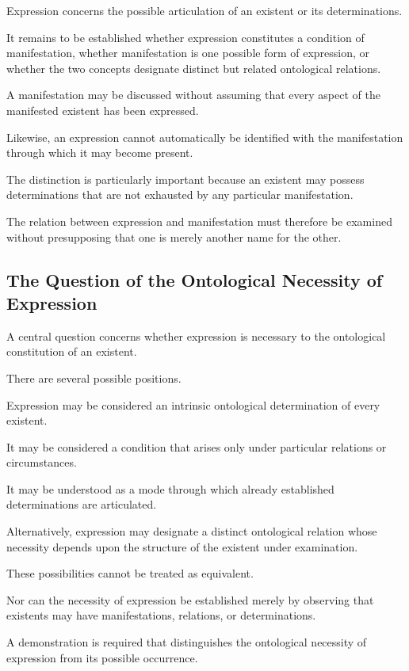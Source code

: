 Expression concerns the possible
articulation of an existent or its
determinations.

It remains to be established whether
expression constitutes a condition
of manifestation, whether manifestation
is one possible form of expression,
or whether the two concepts designate
distinct but related ontological relations.

A manifestation may be discussed
without assuming that every aspect
of the manifested existent has been
expressed.

Likewise, an expression cannot
automatically be identified with
the manifestation through which
it may become present.

The distinction is particularly important
because an existent may possess
determinations that are not exhausted
by any particular manifestation.

The relation between expression
and manifestation must therefore
be examined without presupposing
that one is merely another name
for the other.

\subsection{The Question of the Ontological Necessity of Expression}

A central question concerns whether
expression is necessary to the ontological
constitution of an existent.

There are several possible positions.

Expression may be considered an intrinsic
ontological determination of every existent.

It may be considered a condition that
arises only under particular relations
or circumstances.

It may be understood as a mode through
which already established determinations
are articulated.

Alternatively, expression may designate
a distinct ontological relation whose
necessity depends upon the structure
of the existent under examination.

These possibilities cannot be treated
as equivalent.

Nor can the necessity of expression
be established merely by observing
that existents may have manifestations,
relations, or determinations.

A demonstration is required that distinguishes
the ontological necessity of expression
from its possible occurrence.

